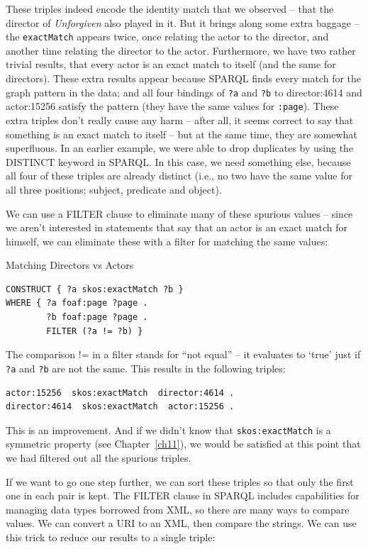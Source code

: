 \begin{challenge}
These triples indeed encode the identity match that we observed -- that
the director of \emph{Unforgiven} also played in it. But it brings along
some extra baggage -- the \texttt{exactMatch} appears twice, once relating the
actor to the director, and another time relating the director to the
actor. Furthermore, we have two rather trivial results, that every actor
is an exact match to itself (and the same for directors). These extra
results appear because SPARQL finds every match for the graph pattern in
the data; and all four bindings of \texttt{?a} and \texttt{?b} to director:4614 and
actor:15256 satisfy the pattern (they have the same values for \texttt{:page}).
These extra triples don't really cause any harm -- after all, it seems
correct to say that something is an exact match to itself -- but at the
same time, they are somewhat superfluous. In an earlier example, we were
able to drop duplicates by using the DISTINCT keyword in SPARQL. In this
case, we need something else, because  all four of these triples are
already distinct (i.e., no two have the same value for all three
positions; subject, predicate and object).

We can use a FILTER clause to eliminate many of these spurious values --
since we aren't interested in statements that say that an actor is an
exact match for himself, we can eliminate these with a filter for
matching the same values:

\begin{query}Matching Directors vs Actors\end{query}
\begin{lstlisting}
CONSTRUCT { ?a skos:exactMatch ?b }
WHERE { ?a foaf:page ?page . 
        ?b foaf:page ?page .
        FILTER (?a != ?b) }
\end{lstlisting}

The comparison != in a filter stands for ``not equal'' -- it evaluates
to `true' just if \texttt{?a} and \texttt{?b} are not the same. This results in the
following triples:

\begin{lstlisting}
actor:15256  skos:exactMatch  director:4614 .
director:4614  skos:exactMatch  actor:15256 .
\end{lstlisting}

This is an improvement. And if we didn't know that \texttt{skos:exactMatch} is a
symmetric property (see Chapter~\ref{ch11}), we would be satisfied at this point that we had filtered out all
the spurious triples.

If we want to go one step further, we can sort these triples so that
only the first one in each pair is kept. The FILTER clause in SPARQL
includes capabilities for managing data types borrowed from XML, so
there are many ways to compare values. We can convert a URI to an XML,
then compare the strings. We can use this trick to reduce our results to
a single triple:


\end{challenge}

